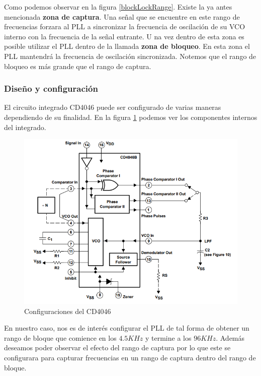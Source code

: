 Como podemos observar en la figura \ref{blockLockRange}. Existe la ya antes mencionada \textbf{zona de captura}. Una señal que se encuentre en este rango de frecuencias forzara al PLL a sincronizar la frecuencia de oscilación de su VCO interno con la frecuencia de la señal entrante. U na vez dentro de esta zona es posible utilizar el PLL dentro de la llamada \textbf{zona de bloqueo}. En esta zona el PLL mantendrá la frecuencia de oscilación sincronizada. Notemos que el rango de bloqueo es más grande que el rango de captura.

\subsubsection{Diseño y configuración}
El circuito integrado CD4046 puede ser configurado de varias maneras dependiendo de su finalidad.
En la figura \ref{configuraciones} podemos ver los componentes internos del integrado. 

\begin{figure}[H]
	\centering
	\includegraphics[scale=0.5]{ImagenesVarias/PLL_innerblockdiagram.png}
	\caption{Configuraciones del CD4046 }
	\label{configuraciones}
\end{figure}

En nuestro caso, nos es de interés configurar el PLL de tal forma de obtener un rango de bloque que comience en los $4.5KHz$ y termine a los $96KHz$. Además deseamos poder observar el efecto del rango de captura por lo que este se configurara para capturar frecuencias en un rango de captura dentro del rango de bloque.




